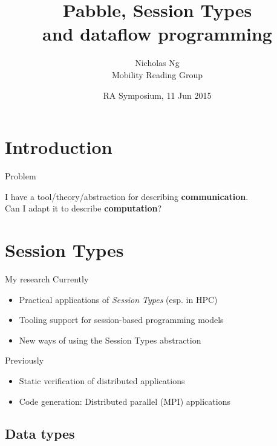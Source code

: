 \documentclass[xcolor={dvipsnames}]{beamer}
\title{Pabble, Session Types\\ and dataflow programming}
\author[Nicholas Ng]{Nicholas Ng\\ Mobility Reading Group}
\date{RA Symposium, 11 Jun 2015}
\begin{document}
\maketitle

\section{Introduction}


\begin{frame}{Problem}
  \begin{center}
  {\Large I have a tool/theory/abstraction for describing
    \textbf{communication}.\\
    Can I adapt it to describe \textbf{computation}?}
    \vfill
  \end{center}
\end{frame}

\section{Session Types}

\begin{frame}{My research}
  Currently
  \begin{itemize}
    \item Practical applications of \textit{Session Types} (esp. in HPC)
    \item Tooling support for session-based programming models
    \item New ways of using the Session Types abstraction
  \end{itemize}
  Previously
  \begin{itemize}
    \item Static verification of distributed applications
    \item Code generation: Distributed parallel (MPI) applications
  \end{itemize}
\end{frame}

\subsection{Data types}
\end{document}

